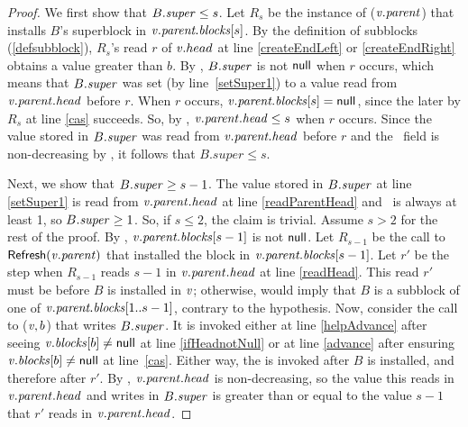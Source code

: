 \superRelationRes*
\begin{proof}
We first show that $B.\mbox{\textit{super}}\leq s$.
Let $R_s$ be the instance of ($\mbox{\textnormal{\textit{v}}}.\mbox{\textit{parent}}$) that installs $B$'s superblock 
in $\mbox{\textnormal{\textit{v}}}.\mbox{\textit{parent.blocks}}[s]$.
By the definition of subblocks (\ref{defsubblock}), $R_s$'s read $r$ of $\mbox{\textnormal{\textit{v}}}.head$ at line \ref{createEndLeft} or \ref{createEndRight} obtains a value greater than $b$.
By , $B.\mbox{\textit{super}}$ is not $\mbox{\sf null}$ when $r$ occurs, which means
that $B.\mbox{\textit{super}}$ was set (by line~\ref{setSuper1}) to a value read from $\mbox{\textnormal{\textit{v}}}.\mbox{\textit{parent}}.\mbox{\textit{head}}$ before $r$.
When $r$ occurs, $\mbox{\textnormal{\textit{v}}}.\mbox{\textit{parent.blocks}}[s] = \mbox{\sf null}$, since the later  by $R_s$ at line
\ref{cas} succeeds.
So, by , $\mbox{\textnormal{\textit{v}}}.\mbox{\textit{parent}}.\mbox{\textit{head}} \leq s$ when $r$ occurs.
Since the value stored in $B.\mbox{\textit{super}}$ was read from $\mbox{\textnormal{\textit{v}}}.\mbox{\textit{parent.head}}$ before $r$ and the \head\ field is non-decreasing by , it follows that $B.super\leq s$.

Next, we show that $B.\mbox{\textit{super}}\geq s-1$.
The value stored in $B.\mbox{\textit{super}}$ at line \ref{setSuper1} is read from $\mbox{\textnormal{\textit{v}}}.\mbox{\textit{parent}}.\mbox{\textit{head}}$ at line \ref{readParentHead} and \head\ is always at least 1, so $B.\mbox{\textit{super}} \geq 1$.
So, if $s\leq 2$, the claim is trivial.  Assume $s>2$ for the rest of the proof.
By , $\mbox{\textnormal{\textit{v}}}.\mbox{\textit{parent.blocks}}[s-1]$ is not $\mbox{\sf null}$.  Let $R_{s-1}$ be the call to
${\sf Refresh}(\mbox{\textnormal{\textit{v}}}.\mbox{\textit{parent}})$ that installed the block in $\mbox{\textnormal{\textit{v}}}.\mbox{\textit{parent.blocks}}[s-1]$.
Let $r'$ be the step when $R_{s-1}$ reads $s-1$ in $\mbox{\textnormal{\textit{v}}}.\mbox{\textit{parent}}.\mbox{\textit{head}}$ at line \ref{readHead}.
This read $r'$ must be before $B$ is installed in $\mbox{\textnormal{\textit{v}}}$;
otherwise,  would imply that $B$ is a subblock of one of 
$\mbox{\textnormal{\textit{v}}}.\mbox{\textit{parent.blocks}}[1..s-1]$, contrary to the hypothesis.
Now, consider the call to ($\mbox{\textnormal{\textit{v}}}, b$) that writes $B.\mbox{\textit{super}}$.
It is invoked either 
at line \ref{helpAdvance} after seeing $\mbox{\textnormal{\textit{v}}}.\mbox{\textit{blocks}}[b]\neq \mbox{\sf null}$ at line \ref{ifHeadnotNull}
or at line \ref{advance} after ensuring $\mbox{\textnormal{\textit{v}}}.\mbox{\textit{blocks}}[b]\neq \mbox{\sf null}$ at line~\ref{cas}.
Either way, the  is invoked after $B$ is installed, and therefore after $r'$.
By , $\mbox{\textnormal{\textit{v}}}.\mbox{\textit{parent}}.\mbox{\textit{head}}$ is non-decreasing, so 
the value this  reads in $\mbox{\textnormal{\textit{v}}}.\mbox{\textit{parent}}.\mbox{\textit{head}}$ and
writes in $B.\mbox{\textit{super}}$ is greater than or equal to the value $s-1$ that $r'$ reads in $\mbox{\textnormal{\textit{v}}}.\mbox{\textit{parent}}.\mbox{\textit{head}}$.
\end{proof}

